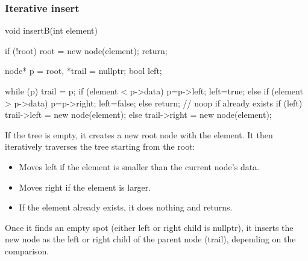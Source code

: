 \documentclass{report}
\begin{document}
\pagebreak 
\subsubsection{Iterative insert}
\bigbreak \noindent 
\begin{cppcode}
    void insertB(int element) {
        if (!root) {
            root = new node(element);
            return;
        }

        node* p = root, *trail = nullptr;
        bool left;

        while (p) {
            trail = p;
            if (element < p->data) {
                p=p->left;
                left=true;
            } else if (element > p->data) {
                p=p->right;
                left=false;
            } else {
                return; // noop if already exists
            }
        }
        if (left) {
            trail->left = new node(element);
        } else {
            trail->right = new node(element);
        }
    }
\end{cppcode}
\bigbreak \noindent 
If the tree is empty, it creates a new root node with the element.
\bigbreak \noindent 
It then iteratively traverses the tree starting from the root:
\begin{itemize}
    \item Moves left if the element is smaller than the current node's data.
    \item Moves right if the element is larger.
    \item If the element already exists, it does nothing and returns.
\end{itemize}
Once it finds an empty spot (either left or right child is nullptr), it inserts the new node as the left or right child of the parent node (trail), depending on the comparison.

\pagebreak 
\end{document}
